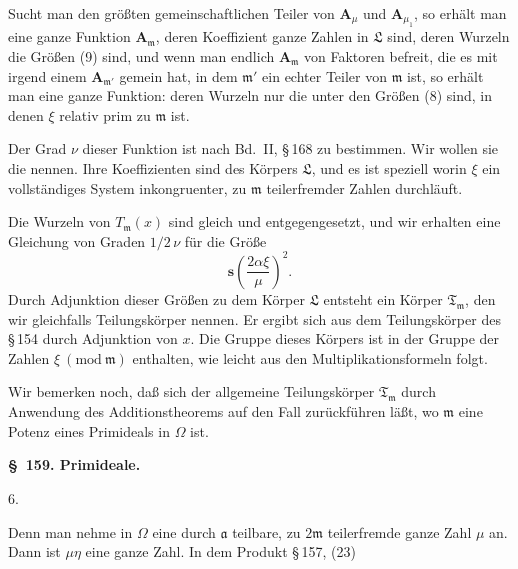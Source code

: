 Sucht man den gr\"o\ss ten gemeinschaftlichen Teiler von $\boldsymbol{A}_\mu$ und
$\boldsymbol{A}_{\mu_1}$, so erh\"alt man eine ganze Funktion $\boldsymbol{A}_{\mathfrak{m}}$, deren Koeffizient %
ganze Zahlen in $\mathfrak{L}$ sind, deren Wurzeln die Gr\"o\ss en (9) sind, und
wenn man endlich $\boldsymbol{A}_{\mathfrak{m}}$ von Faktoren befreit, die es mit irgend
einem $\boldsymbol{A}_{\mathfrak{m}'}$ gemein hat, in dem $\mathfrak{m}'$ ein echter Teiler von $\mathfrak{m}$ ist, so
erh\"alt man eine ganze Funktion:
deren Wurzeln nur die unter den Gr\"o\ss en (8) sind, in denen $\xi$
relativ prim zu $\mathfrak{m}$ ist.

Der Grad $\nu$ dieser Funktion ist nach Bd.\ II, \S\,168 zu bestimmen.
Wir wollen sie die  nennen. Ihre Koeffizienten
sind  des K\"orpers $\mathfrak{L}$, und es ist
speziell
worin $\xi$ ein vollst\"andiges System inkongruenter, zu $\mathfrak{m}$ teilerfremder
Zahlen durchl\"auft.

Die Wurzeln von $T_{\mathfrak{m}}(x)$ sind gleich und entgegengesetzt, und
wir erhalten eine Gleichung von Graden $1/2\,\nu$ f\"ur die Gr\"o\ss e
\[
\boldsymbol{s}\!\left(\frac{2\alpha\xi}{\mu}\right)^{2}.
\]
Durch Adjunktion dieser Gr\"o\ss en zu dem K\"orper $\mathfrak{L}$ entsteht
ein K\"orper $\mathfrak{T}_{\mathfrak{m}}$, den wir gleichfalls Teilungsk\"orper nennen. Er
ergibt sich aus dem Teilungsk\"orper des \S\,154 durch Adjunktion
von $x$. Die Gruppe dieses K\"orpers ist in der Gruppe der Zahlen
$\xi\ (\mathrm{mod}\ \mathfrak{m})$ enthalten, wie leicht aus den Multiplikationsformeln
folgt.

Wir bemerken noch, da\ss{} sich der allgemeine Teilungsk\"orper
$\mathfrak{T}_{\mathfrak{m}}$ durch Anwendung des Additionstheorems auf den Fall
zur\"uckf\"uhren l\"a\ss t, wo $\mathfrak{m}$ eine Potenz eines Primideals in $\Omega$ ist.

\begin{center}
\textbf{\S\ 159. Primideale.}
\end{center}

6. 

Denn man nehme in $\Omega$ eine durch $\mathfrak{a}$ teilbare, zu $2\mathfrak{m}$ teilerfremde
 ganze Zahl $\mu$ an. Dann ist $\mu\eta$ eine ganze Zahl. In dem
Produkt \S\,157, (23)

